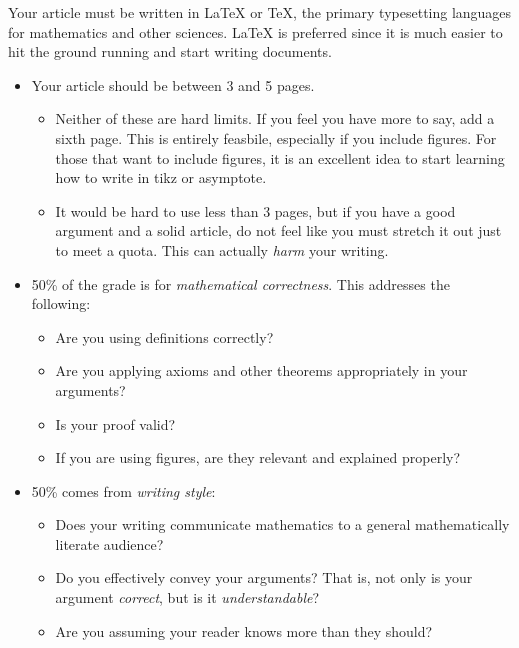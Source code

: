 \documentclass{article}
\begin{document}
    \par\hfill\par
    Your article must be written in \LaTeX{} or \TeX, the primary typesetting
    languages for mathematics and other sciences. \LaTeX{} is preferred since it
    is much easier to hit the ground running and start writing documents.
    \begin{itemize}
        \item
            Your article should be between 3 and 5 pages.
            \begin{itemize}
                \item
                    Neither of these are hard limits. If you feel you have more
                    to say, add a sixth page. This is entirely feasbile,
                    especially if you include figures. For those that want
                    to include figures, it is an excellent idea to start
                    learning how to write in tikz or asymptote.
                \item
                    It would be hard to use less than 3 pages, but if you have
                    a good argument and a solid article, do not feel like you
                    must stretch it out just to meet a quota. This can actually
                    \textit{harm} your writing.
            \end{itemize}
        \item
            50\% of the grade is for \textit{mathematical correctness}.
            This addresses the following:
            \begin{itemize}
                \item
                    Are you using definitions correctly?
                \item
                    Are you applying axioms and other theorems
                    appropriately in your arguments?
                \item
                    Is your proof valid?
                \item
                    If you are using figures, are they relevant and explained
                    properly?
            \end{itemize}
        \item
            50\% comes from \textit{writing style}:
            \begin{itemize}
                \item
                    Does your writing communicate mathematics to a general
                    mathematically literate audience?
                \item
                    Do you effectively convey your arguments? That is, not
                    only is your argument \textit{correct}, but is it
                    \textit{understandable}?
                \item
                    Are you assuming your reader knows more than
                    they should?
            \end{itemize}
    \end{itemize}
\end{document}
